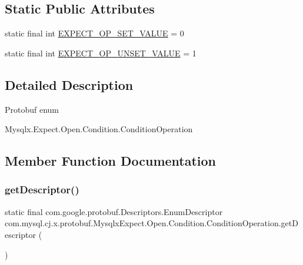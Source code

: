 \subsection*{Static Public Attributes}
\begin{DoxyCompactItemize}
\item 
static final int \mbox{\hyperlink{enumcom_1_1mysql_1_1cj_1_1x_1_1protobuf_1_1_mysqlx_expect_1_1_open_1_1_condition_1_1_condition_operation_a8d5858263c68a41260982044487ca3ff}{E\+X\+P\+E\+C\+T\+\_\+\+O\+P\+\_\+\+S\+E\+T\+\_\+\+V\+A\+L\+UE}} = 0
\item 
static final int \mbox{\hyperlink{enumcom_1_1mysql_1_1cj_1_1x_1_1protobuf_1_1_mysqlx_expect_1_1_open_1_1_condition_1_1_condition_operation_a6648d724f37b7901ba2e64e9a4968cc1}{E\+X\+P\+E\+C\+T\+\_\+\+O\+P\+\_\+\+U\+N\+S\+E\+T\+\_\+\+V\+A\+L\+UE}} = 1
\end{DoxyCompactItemize}


\subsection{Detailed Description}
Protobuf enum
\begin{DoxyCode}
Mysqlx.Expect.Open.Condition.ConditionOperation 
\end{DoxyCode}
 

\subsection{Member Function Documentation}
\mbox{\label{enumcom_1_1mysql_1_1cj_1_1x_1_1protobuf_1_1_mysqlx_expect_1_1_open_1_1_condition_1_1_condition_operation_a1834e7f55e6abe6cb246df1ead9631a5}} 
\subsubsection{\texorpdfstring{get\+Descriptor()}{getDescriptor()}}
{\footnotesize\ttfamily static final com.\+google.\+protobuf.\+Descriptors.\+Enum\+Descriptor com.\+mysql.\+cj.\+x.\+protobuf.\+Mysqlx\+Expect.\+Open.\+Condition.\+Condition\+Operation.\+get\+Descriptor (\begin{DoxyParamCaption}{ }\end{DoxyParamCaption})\hspace{0.3cm}{\ttfamily [static]}}

